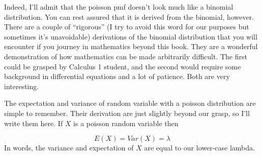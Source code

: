 \documentclass[
]{book}
\theoremstyle{definition}
\theoremstyle{definition}
\theoremstyle{definition}
\theoremstyle{definition}
\theoremstyle{remark}
\begin{document}
Indeed, I'll admit that the poisson pmf doesn't look much like a binomial distribution. You can rest assured that it is derived from the binomial, however. There are a couple of ``rigorous'' (I try to avoid this word for our purposes but sometimes it's unavoidable) derivations of the binomial distribution that you will encounter if you journey in mathematics beyond this book. They are a wonderful demonstration of how mathematics can be made arbitrarily difficult. The first could be grasped by Calculus 1 student, and the second would require some background in differential equations and a lot of patience. Both are very interesting.

The expectation and variance of random variable with a poisson distribution are simple to remember. Their derivation are just slightly beyond our grasp, so I'll write them here. If \(X\) is a poisson random variable then

\[
E(X) = Var(X) = \lambda
\]
In words, the variance and expectation of \(X\) are equal to our lower-case lambda.
\end{document}
